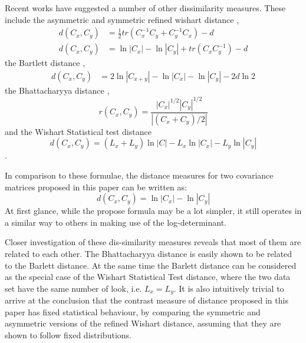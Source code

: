 \documentclass[journal]{IEEEtran}
\begin{document}
Recent works have suggested a number of other dissimilarity measures.
These include the asymmetric and symmetric refined wishart distance \cite{Anfinsen_2007_ESA_POLINSAR},
\begin{align}
  d(C_x,C_y) &= \frac{1}{2} tr(C_x^{-1}C_y + C_y^{-1}C_x) - d \\
    d(C_x,C_y) &= \ln|C_x| - \ln|C_y| + tr(C_xC_y^{-1}) - d
\end{align}
the Bartlett distance \cite{Kersten_2005_TGRS_519},
  \begin{align}
  d(C_x,C_y) &= 2 \ln |C_{x+y}| - \ln |C_x| - \ln |C_y| - 2d\ln2
  \end{align}
the Bhattacharyya distance \cite{Lee_2011_IGARSS_3740},
\begin{equation}
  r(C_x,C_y) = \frac{|C_x|^{1/2} |C_y|^{1/2}}{|(C_x+C_y)/2|}
\end{equation}
and the Wishart Statistical test distance \cite{Cao_2007_TGRS_3454}
\begin{equation}
  d(C_x,C_y) = (L_x + L_y) \ln|C| - L_x \ln|C_x| - L_y\ln|C_y|
\end{equation}
.

In comparison to these formulae, the distance measures for two covariance matrices proposed in this paper can be written as:
\begin{equation}
  d(C_x,C_y) =  \ln|C_x| - \ln|C_y| 
\end{equation}
At first glance, while the propose formula may be a lot simpler, it still operates in a similar way to others in making use of the log-determinant.

Closer investigation of these dis-similarity measures reveals that most of them are related to each other.
The Bhattacharyya distance is easily shown to be related to the Barlett distance.
At the same time the Barlett distance can be considered as the special case of the Wishart Statistical Test distance, where the two data set have the same number of look, i.e. $L_x=L_y$.
It is also intuitively trivial to arrive at the conclusion that the contrast measure of distance proposed in this paper has fixed statistical behaviour, by comparing the symmetric and asymmetric versions of the refined Wishart distance, assuming that they are shown to follow fixed distributions.
\end{document}
